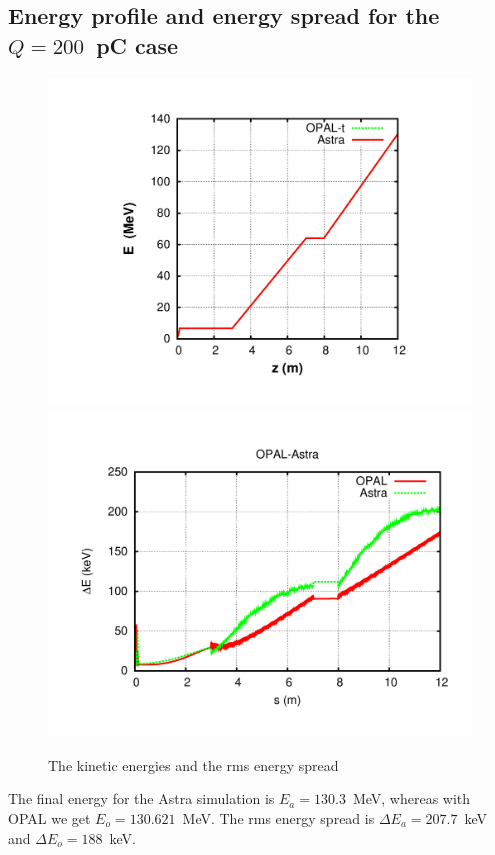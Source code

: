 \documentclass{psi-note}    %
\begin{document}
\subsection{Energy profile and energy spread for the $Q=200$~pC case}  \label{sec:OPALAstra-SC}
\begin{figure}[htbp]
\begin{center}
\includegraphics[width=.49\linewidth,angle=0]{figures/opal-astra-energy-1}
\includegraphics[width=.49\linewidth,angle=0]{figures/opal-astra-de-1}
\caption{The kinetic energies and the rms energy spread }
\label{fig:opal-astra-energy-1}
\end{center}
\end{figure}
The final energy for the Astra simulation is $E_a=130.3$~MeV, whereas with OPAL we get
$E_o=130.621$~MeV. The rms energy spread is $\Delta E_a=207.7$~keV and $\Delta
E_o = 188$~keV.
\end{document}
